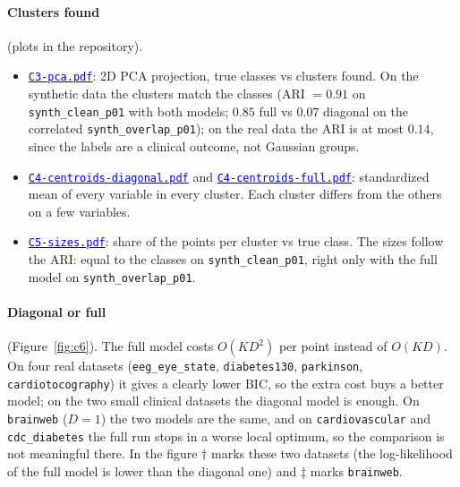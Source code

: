 \documentclass[conference,onecolumn]{IEEEtran}
\newcommand{\srclink}[2]{\href{#1}{\textcolor{blue}{#2}}}
\begin{document}
\paragraph{Clusters found} (plots in the repository).
\begin{itemize}
\item \srclink{https://github.com/HPC-2627/ParallelExpectationMaximizationClustering/blob/main/results/plots/cluster/C3-pca.pdf}{\texttt{C3-pca.pdf}}: 2D PCA projection, true classes vs clusters found. On the synthetic data the clusters match the classes (ARI $=0.91$ on \texttt{synth\_clean\_p01} with both models; $0.85$ full vs $0.07$ diagonal on the correlated \texttt{synth\_overlap\_p01}); on the real data the ARI is at most $0.14$, since the labels are a clinical outcome, not Gaussian groups.
\item \srclink{https://github.com/HPC-2627/ParallelExpectationMaximizationClustering/blob/main/results/plots/cluster/C4-centroids-diagonal.pdf}{\texttt{C4-centroids-diagonal.pdf}} and \srclink{https://github.com/HPC-2627/ParallelExpectationMaximizationClustering/blob/main/results/plots/cluster/C4-centroids-full.pdf}{\texttt{C4-centroids-full.pdf}}: standardized mean of every variable in every cluster. Each cluster differs from the others on a few variables.
\item \srclink{https://github.com/HPC-2627/ParallelExpectationMaximizationClustering/blob/main/results/plots/cluster/C5-sizes.pdf}{\texttt{C5-sizes.pdf}}: share of the points per cluster vs true class. The sizes follow the ARI: equal to the classes on \texttt{synth\_clean\_p01}, right only with the full model on \texttt{synth\_overlap\_p01}.
\end{itemize}

\paragraph{Diagonal or full} (Figure~\ref{fig:c6}). The full model costs $O(KD^2)$ per point instead of $O(KD)$. On four real datasets (\texttt{eeg\_eye\_state}, \texttt{diabetes130}, \texttt{parkinson}, \texttt{cardiotocography}) it gives a clearly lower BIC, so the extra cost buys a better model; on the two small clinical datasets the diagonal model is enough. On \texttt{brainweb} ($D=1$) the two models are the same, and on \texttt{cardiovascular} and \texttt{cdc\_diabetes} the full run stops in a worse local optimum, so the comparison is not meaningful there. In the figure $\dagger$ marks these two datasets (the log-likelihood of the full model is lower than the diagonal one) and $\ddagger$ marks \texttt{brainweb}.
\end{document}
